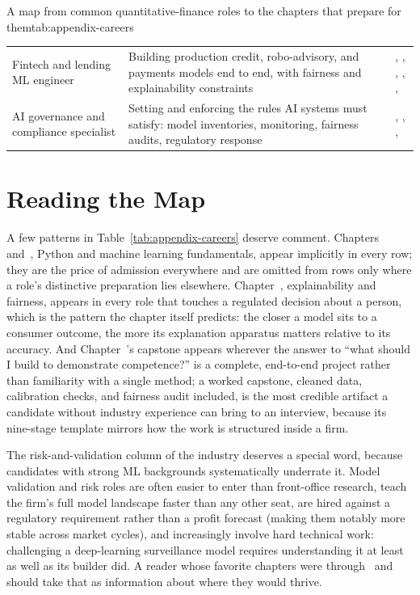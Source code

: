 \documentclass[../ai_in_finance]{subfiles}
\begin{document}
\begin{booktable}[htbp]{A map from common quantitative-finance roles to the chapters that prepare for them}{tab:appendix-careers}
\begin{tabular}{L{3.4cm}L{5.6cm}L{3.4cm}}
Fintech and lending ML engineer & Building production credit, robo-advisory, and payments models end to end, with fairness and explainability constraints & , , , , ,  \\
AI governance and compliance specialist & Setting and enforcing the rules AI systems must satisfy: model inventories, monitoring, fairness audits, regulatory response & , , ,  \\
\bottomrule
\end{tabular}
\end{booktable}

\section{Reading the Map}

A few patterns in Table~\ref{tab:appendix-careers} deserve comment. Chapters~ and~, Python and machine learning fundamentals, appear implicitly in every row; they are the price of admission everywhere and are omitted from rows only where a role's distinctive preparation lies elsewhere. Chapter~, explainability and fairness, appears in every role that touches a regulated decision about a person, which is the pattern the chapter itself predicts: the closer a model sits to a consumer outcome, the more its explanation apparatus matters relative to its accuracy. And Chapter~'s capstone appears wherever the answer to ``what should I build to demonstrate competence?'' is a complete, end-to-end project rather than familiarity with a single method; a worked capstone, cleaned data, calibration checks, and fairness audit included, is the most credible artifact a candidate without industry experience can bring to an interview, because its nine-stage template mirrors how the work is structured inside a firm.

The risk-and-validation column of the industry deserves a special word, because candidates with strong ML backgrounds systematically underrate it. Model validation and risk roles are often easier to enter than front-office research, teach the firm's full model landscape faster than any other seat, are hired against a regulatory requirement rather than a profit forecast (making them notably more stable across market cycles), and increasingly involve hard technical work: challenging a deep-learning surveillance model requires understanding it at least as well as its builder did. A reader whose favorite chapters were  through~ and~ should take that as information about where they would thrive.
\end{document}
